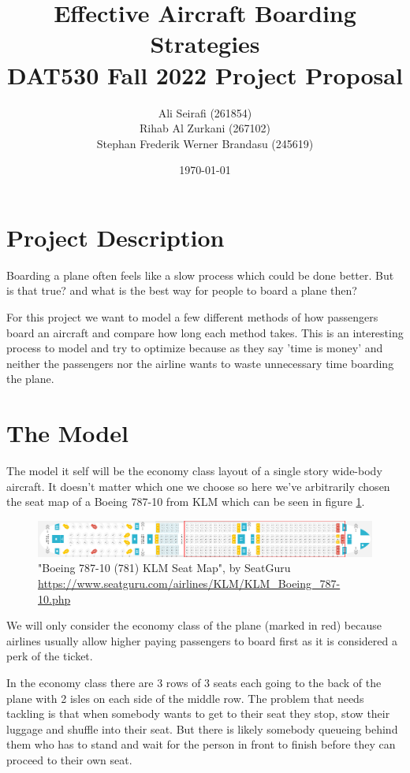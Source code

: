 \documentclass{article}
\title{Effective Aircraft Boarding Strategies \\
\large{DAT530 Fall 2022 Project Proposal}}
\date{\today}
\author{Ali Seirafi (261854)\\ 
Rihab Al Zurkani (267102)\\ 
Stephan Frederik Werner Brandasu (245619)}
\begin{document}
\maketitle
\section{Project Description}
Boarding a plane often feels like a slow process which could be done better.
But is that true? and what is the best way for people to board a plane then?

For this project we want to model a few different methods of how passengers board
an aircraft and compare how long each method takes. This is an interesting
process to model and try to optimize because as they say 
'time is money' and neither the passengers nor the airline wants
to waste unnecessary time boarding the plane. 


\section{The Model}
The model it self will be the economy class layout of a single story wide-body aircraft. 
It doesn't matter which one we choose so here we've arbitrarily chosen the seat map of a
Boeing 787-10 from KLM which can be seen in figure \ref{fig:787seatmap}.

\begin{figure}[h]
    \centering
    \includegraphics[width=\textwidth]{KLM_Boeing_787-10.png}
    \caption{"Boeing 787-10 (781) KLM Seat Map", by SeatGuru \url{https://www.seatguru.com/airlines/KLM/KLM_Boeing_787-10.php}}
    \label{fig:787seatmap}
\end{figure}

We will only consider the economy class of the plane (marked in red) because
airlines usually allow higher paying passengers to board first as 
it is considered a perk of the ticket. 

In the economy class there are 3 rows of 3 seats each going to the back of the plane with 
2 isles on each side of the middle row. The problem that needs 
tackling is that when somebody wants to get to their seat they stop, 
stow their luggage and shuffle into their seat. But there is likely
somebody queueing behind them who has to stand and wait for the person 
in front to finish before they can proceed to their own seat. 
\end{document}
